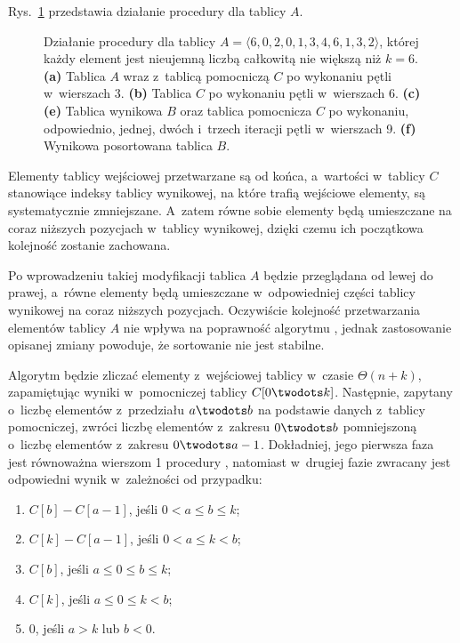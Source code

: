 
\exercise %
Rys.\ \ref{fig:8.2-1} przedstawia działanie procedury  dla tablicy $A$.
\begin{figure}[!ht]
	\centering 
	\caption{Działanie procedury  dla tablicy $A=\langle6,0,2,0,1,3,4,6,1,3,2\rangle$, której każdy element jest nieujemną liczbą całkowitą nie większą niż $k=6$.
{\sffamily\bfseries(a)} Tablica $A$ wraz z~tablicą pomocniczą $C$ po wykonaniu pętli w~wierszach 3.
{\sffamily\bfseries(b)} Tablica $C$ po wykonaniu pętli w~wierszach 6.
{\sffamily\bfseries(c)\nbendash(e)} Tablica wynikowa $B$ oraz tablica pomocnicza $C$ po wykonaniu, odpowiednio, jednej, dwóch i~trzech iteracji pętli  w~wierszach 9.
{\sffamily\bfseries(f)} Wynikowa posortowana tablica $B$.} \label{fig:8.2-1}
\end{figure}

\exercise %
Elementy tablicy wejściowej przetwarzane są od końca, a~wartości w~tablicy $C$ stanowiące indeksy tablicy wynikowej, na które trafią wejściowe elementy, są systematycznie zmniejszane.
A~zatem równe sobie elementy będą umieszczane na coraz niższych pozycjach w~tablicy wynikowej, dzięki czemu ich początkowa kolejność zostanie zachowana.

\exercise %
Po wprowadzeniu takiej modyfikacji tablica $A$ będzie przeglądana od lewej do prawej, a~równe elementy będą umieszczane w~odpowiedniej części tablicy wynikowej na coraz niższych pozycjach.
Oczywiście kolejność przetwarzania elementów tablicy $A$ nie wpływa na poprawność algorytmu , jednak zastosowanie opisanej zmiany powoduje, że sortowanie nie jest stabilne.

\exercise %
Algorytm będzie zliczać elementy z~wejściowej tablicy w~czasie $\Theta(n+k)$, zapamiętując wyniki w~pomocniczej tablicy $C[0\twodots k]$.
Następnie, zapytany o~liczbę elementów z~przedziału $a\twodots b$ na podstawie danych z~tablicy pomocniczej, zwróci liczbę elementów z~zakresu $0\twodots b$ pomniejszoną o~liczbę elementów z~zakresu $0\twodots a-1$.
Dokładniej, jego pierwsza faza jest równoważna wierszom 1 procedury , natomiast w~drugiej fazie zwracany jest odpowiedni wynik w~zależności od przypadku:
\begin{enumerate}
	\renewcommand{\labelenumi}{(\roman{enumi})}
	\item $C[b]-C[a-1]$, jeśli $0<a\le b\le k$;
	\item $C[k]-C[a-1]$, jeśli $0<a\le k<b$;
	\item $C[b]$, jeśli $a\le0\le b\le k$;
	\item $C[k]$, jeśli $a\le0\le k<b$;
	\item 0, jeśli $a>k$ lub $b<0$.
\end{enumerate}
